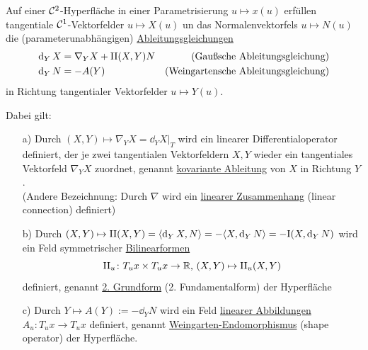 \begin{satz}\label{satz214}
 Auf einer \(\mathcal{C}^2\)-Hyperfläche in einer Parametrisierung \(u \mapsto x(u) \) erfüllen tangentiale \(\mathcal{C}^1\)-Vektorfelder \(u \mapsto X(u)\) un das Normalenvektorfels \(u \mapsto N(u)\) die (parameterunabhängigen) \uline{Ableitungsgleichun}\-\uline{gen}
\begin{align*}
 \dd_Y X &= \nabla_Y X + \Rom 2 (X,Y) N & \text{(Gaußsche Ableitungsgleichung)} \\
 \dd_Y N &= -A (Y) & \text{(Weingartensche Ableitungsgleichung)}
\end{align*}
in Richtung tangentialer Vektorfelder \(u \mapsto Y(u)\). \par
Dabei gilt:
\begin{enumerate}
 \item[a)] Durch \((X,Y) \mapsto \nabla_Y X = \dd_Y X |_T\) wird ein linearer Differentialoperator definiert, der je zwei tangentialen Vektorfeldern \(X,Y\) wieder ein tangentiales Vektorfeld \(\nabla_Y X\) zuordnet, genannt \uline{kovariante Ableitung} von \(X\) in Richtung \(Y\). \\
 (Andere Bezeichnung: Durch \(\nabla\) wird ein \uline{linearer Zusammenhang} (linear connection) definiert)
 \item[b)] Durch \((X,Y) \mapsto \Rom 2(X,Y) = \langle \dd_Y X, N\rangle = -\langle X, \dd_Y N \rangle = -\Rom 1 (X, \dd_YN)\) wird ein Feld symmetrischer \uline{Bilinearformen} 
 \[
  \Rom 2_u \colon T_u x \times T_u x \to \IR, \, (X,Y) \mapsto \Rom 2_u (X,Y)
 \]
 definiert, genannt \uline{2. Grundform} (2. Fundamentalform) der Hyperfläche
 \item[c)] Durch \(Y \mapsto A(Y) := -\dd_Y N\) wird ein Feld \uline{linearer Abbildungen} \(A_u \colon T_u x \to T_u x\) definiert, genannt \uline{Weingarten-Endomorphismus} (shape operator) der Hyperfläche.
\end{enumerate}

\end{satz}


